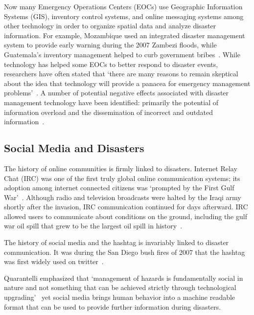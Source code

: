 Now many Emergency Operations Centers (EOCs) use Geographic Information Systems
(GIS), inventory control systems, and online messaging systems among other
technology in order to organize spatial data and analyze disaster information.
For example, Mozambique used an integrated disaster management system to provide
early warning during the 2007  Zambezi floods, while Guatemala's inventory
management helped to curb government bribes~\cite{aminDataNaturalDisasters2008}.
While technology has helped some EOCs to better respond to disaster events,
researchers have often stated that `there are many reasons to remain skeptical
about the idea that technology will provide a panacea for emergency management
problems'~\cite{tzemosUseGISFederal1995, tierneyFacingUnexpectedDisaster2001,
perryNaturalDisasterManagement2007}. A number of potential negative effects
associated with disaster management technology have been identified: primarily
the potential of information overload and the dissemination of incorrect and
outdated information~\cite{quarantelliProblematicalAspectsInformation1997,
flentgeDesigningContextAwareHCI}.

\subsection{Social Media and Disasters}
The history of online communities is firmly linked to disasters. Internet
Relay Chat (IRC) was one of the first truly global online communication systems;
its adoption among internet connected citizens was `prompted by the First Gulf
War'~\cite{salazarHashtagsAnnotatedHistory2017}. Although radio and
television broadcasts were halted by the Iraqi army shortly after the invasion,
IRC communication continued for days afterward. IRC allowed users to communicate
about conditions on the ground, including the gulf war oil spill that grew to be
the largest oil spill in history~\cite{Timeline20Years2010}.

The history of social media and the hashtag is invariably linked to disaster
communication.  It was during the San Diego bush fires of 2007 that the hashtag
was first widely used on twitter~\cite{salazarHashtagsAnnotatedHistory2017}.

Quarantelli emphasized that  `management of hazards is fundamentally social in
nature and not something that can be achieved strictly through technological
upgrading'~\cite{tierneyFacingUnexpectedDisaster2001} yet social media brings
human behavior into a machine readable format that can be used to provide
further information during disasters.

